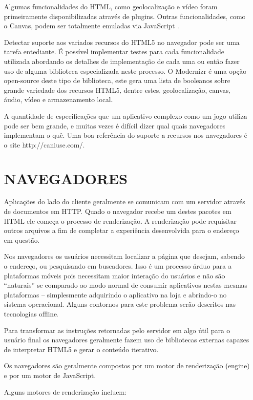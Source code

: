 Algumas funcionalidades do HTML, como geolocalização e vídeo
foram primeiramente disponibilizadas através de plugins. Outras
funcionalidades, como o Canvas, podem ser totalmente emuladas via
JavaScript \autocite{diveIntohtml}.

Detectar suporte aos variados recursos do HTML5 no navegador
pode ser uma tarefa entediante. É possível implementar testes para
cada funcionalidade utilizada abordando os detalhes de implementação
de cada uma ou então fazer uso de alguma biblioteca especializada
neste processo. O Modernizr é uma opção open-source deste tipo de
biblioteca, este gera uma lista de booleanos sobre grande variedade dos
recursos HTML5, dentre estes, geolocalização, canvas, áudio, vídeo e
armazenamento local.

A quantidade de especificações que um aplicativo complexo como um jogo
utiliza pode ser bem grande, e muitas vezes é difícil dizer qual quais
navegadores implementam o quê. Uma boa referência do suporte a recursos
nos navegadores é o site http://caniuse.com/.

\section{NAVEGADORES}
Aplicações do lado do cliente geralmente se comunicam com um
servidor através de documentos em HTTP. Quado o navegador recebe um
destes pacotes em HTML ele começa o processo de renderização. A
renderização pode requisitar outros arquivos a fim de completar a
experiência desenvolvida para o endereço em questão.

Nos navegadores os usuários necessitam localizar a página que desejam,
sabendo o endereço, ou pesquisando em buscadores. Isso é um processo
árduo para a plataformas móveis pois necessitam maior interação
do usuários e não são “naturais” se comparado ao modo normal
de consumir aplicativos nestas mesmas plataformas – simplesmente
adquirindo o aplicativo na loja e abrindo-o no sistema operacional.
Alguns contornos para este problema serão descritos nas tecnologias
offline.

Para transformar as instruções retornadas pelo servidor em algo útil
para o usuário final os navegadores geralmente fazem uso de bibliotecas
externas capazes de interpretar HTML5 e gerar o conteúdo iterativo.

Os navegadores são geralmente compostos por um motor de renderização (engine)
e por um motor de JavaScript.

Alguns motores de renderização incluem:

